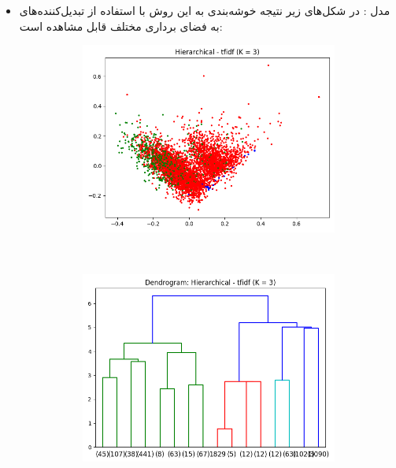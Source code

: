 \documentclass[11pt]{article}
\begin{document}
\begin{itemize}
\item 
مدل  : در شکل‌های زیر نتیجه خوشه‌بندی به این روش با استفاده از تبدیل‌کننده‌های به فضای برداری مختلف قابل مشاهده است: \\
\begin{figure}[H]
\begin{center}
\begin{subfigure}{0.4\textwidth}
\includegraphics[width=\textwidth]{pics/hier_tfidf.png}
\caption{}
\end{subfigure}
~
\begin{subfigure}{0.4\textwidth}
\includegraphics[width=\textwidth]{pics/dendro_tfidf.png}
\caption{}
\end{subfigure}


\end{center}
\end{figure}
\end{itemize}
\end{document}
